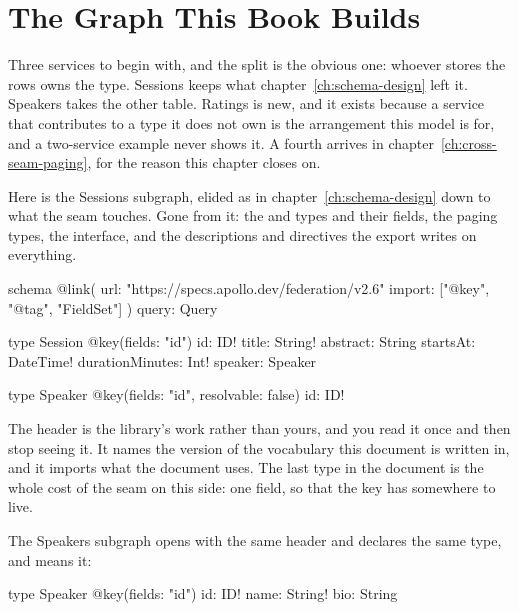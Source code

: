 \section{The Graph This Book Builds}
\label{sec:ch05-the-graph-this-book-builds}

%
Three services to begin with, and the split is the obvious one: whoever stores
the rows owns the type. Sessions keeps what chapter~\ref{ch:schema-design} left
it. Speakers takes the other table. Ratings is new, and it exists because a
service that contributes to a type it does not own is the arrangement this
model is for, and a two-service example never shows it. A fourth arrives in
chapter~\ref{ch:cross-seam-paging}, for the reason this chapter closes on.

%
Here is the Sessions subgraph, elided as in
chapter~\ref{ch:schema-design} down to what the seam touches. Gone from it:
the  and  types and their fields, the paging types,
the  interface, and the descriptions and  directives the
export writes on everything.

\begin{graphqlsdl}
schema
  @link(
    url: "https://specs.apollo.dev/federation/v2.6"
    import: ["@key", "@tag", "FieldSet"]
  ) {
  query: Query
}

type Session @key(fields: "id") {
  id: ID!
  title: String!
  abstract: String
  startsAt: DateTime!
  durationMinutes: Int!
  speaker: Speaker
}

type Speaker @key(fields: "id", resolvable: false) {
  id: ID!
}
\end{graphqlsdl}

%
The header is the library's work rather than yours, and you read it once and
then stop seeing it. It names the version of the vocabulary this document is written in, and
it imports what the document uses. The last type in the document is the whole
cost of the seam on this side: one field, so that the key has somewhere to
live.

%
The Speakers subgraph opens with the same header and declares the same type,
and means it:

\begin{graphqlsdl}
type Speaker @key(fields: "id") {
  id: ID!
  name: String!
  bio: String
}
\end{graphqlsdl}

